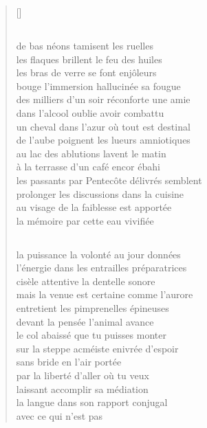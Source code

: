 \documentclass[a4paper, titlepage, twoside, 12pt]{book}
\begin{document}
\begin{verse}[\versewidth]
\subsection*{}
de bas néons tamisent les ruelles\\
les flaques brillent le feu des huiles\\
les bras de verre se font enjôleurs\\
bouge l'immersion hallucinée sa fougue\\
des milliers d'un soir réconforte une amie\\
dans l'alcool oublie avoir combattu\\
un cheval dans l'azur où tout est destinal\\
de l'aube poignent les lueurs amniotiques\\
au lac des ablutions lavent le matin\\
à la terrasse d'un café encor ébahi\\
les passants par Pentecôte délivrés semblent\\
prolonger les discussions dans la cuisine\\
au visage de la faiblesse est apportée\\
la mémoire par cette eau vivifiée 

\subsection*{}
la puissance la volonté au jour données\\
l'énergie dans les entrailles préparatrices\\
cisèle attentive la dentelle sonore\\
mais la venue est certaine comme l'aurore\\
entretient les pimprenelles épineuses\\
devant la pensée l'animal avance\\
le col abaissé que tu puisses monter\\
sur la steppe acméiste enivrée d'espoir\\
sans bride en l'air portée\\
par la liberté d'aller où tu veux\\
laissant accomplir sa médiation\\
la langue dans son rapport conjugal\\
avec ce qui n'est pas


\end{verse}


\newpage
\end{document}
